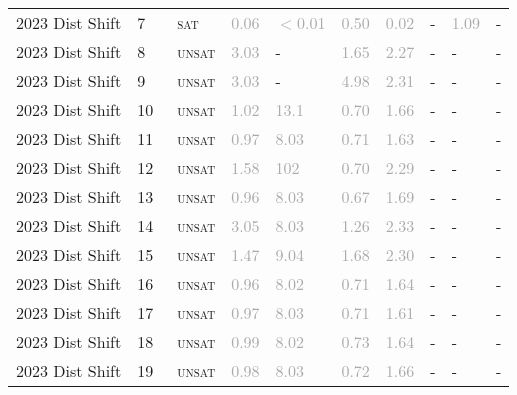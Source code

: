 \begin{center}
{\begin{longtable}{@{}llllllllll@{}}
2023 Dist Shift & 7 & ~\textsc{sat} & \textcolor{darkgray}{0.06} & \textcolor{darkgray}{$<$0.01} & \textcolor{darkgray}{0.50} & \textcolor{darkgray}{0.02} & - & \textcolor{darkgray}{1.09} & - \\
2023 Dist Shift & 8 & ~\textsc{unsat} & \textcolor{darkgray}{3.03} & - & \textcolor{darkgray}{1.65} & \textcolor{darkgray}{2.27} & - & - & - \\
2023 Dist Shift & 9 & ~\textsc{unsat} & \textcolor{darkgray}{3.03} & - & \textcolor{darkgray}{4.98} & \textcolor{darkgray}{2.31} & - & - & - \\
2023 Dist Shift & 10 & ~\textsc{unsat} & \textcolor{darkgray}{1.02} & \textcolor{darkgray}{13.1} & \textcolor{darkgray}{0.70} & \textcolor{darkgray}{1.66} & - & - & - \\
2023 Dist Shift & 11 & ~\textsc{unsat} & \textcolor{darkgray}{0.97} & \textcolor{darkgray}{8.03} & \textcolor{darkgray}{0.71} & \textcolor{darkgray}{1.63} & - & - & - \\
2023 Dist Shift & 12 & ~\textsc{unsat} & \textcolor{darkgray}{1.58} & \textcolor{darkgray}{102} & \textcolor{darkgray}{0.70} & \textcolor{darkgray}{2.29} & - & - & - \\
2023 Dist Shift & 13 & ~\textsc{unsat} & \textcolor{darkgray}{0.96} & \textcolor{darkgray}{8.03} & \textcolor{darkgray}{0.67} & \textcolor{darkgray}{1.69} & - & - & - \\
2023 Dist Shift & 14 & ~\textsc{unsat} & \textcolor{darkgray}{3.05} & \textcolor{darkgray}{8.03} & \textcolor{darkgray}{1.26} & \textcolor{darkgray}{2.33} & - & - & - \\
2023 Dist Shift & 15 & ~\textsc{unsat} & \textcolor{darkgray}{1.47} & \textcolor{darkgray}{9.04} & \textcolor{darkgray}{1.68} & \textcolor{darkgray}{2.30} & - & - & - \\
2023 Dist Shift & 16 & ~\textsc{unsat} & \textcolor{darkgray}{0.96} & \textcolor{darkgray}{8.02} & \textcolor{darkgray}{0.71} & \textcolor{darkgray}{1.64} & - & - & - \\
2023 Dist Shift & 17 & ~\textsc{unsat} & \textcolor{darkgray}{0.97} & \textcolor{darkgray}{8.03} & \textcolor{darkgray}{0.71} & \textcolor{darkgray}{1.61} & - & - & - \\
2023 Dist Shift & 18 & ~\textsc{unsat} & \textcolor{darkgray}{0.99} & \textcolor{darkgray}{8.02} & \textcolor{darkgray}{0.73} & \textcolor{darkgray}{1.64} & - & - & - \\
2023 Dist Shift & 19 & ~\textsc{unsat} & \textcolor{darkgray}{0.98} & \textcolor{darkgray}{8.03} & \textcolor{darkgray}{0.72} & \textcolor{darkgray}{1.66} & - & - & - \\

\end{longtable}}
\end{center}
